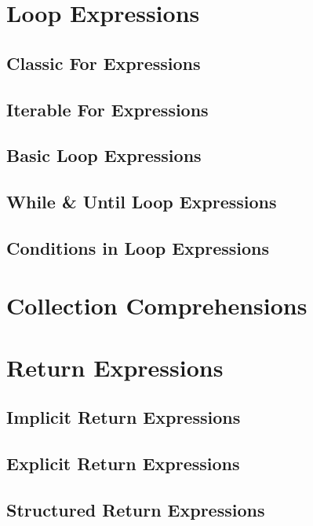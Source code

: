 \section{Loop Expressions}

\subsection{Classic For Expressions}

\subsection{Iterable For Expressions}

\subsection{Basic Loop Expressions}

\subsection{While \& Until Loop Expressions}

\subsection{Conditions in Loop Expressions}

\section{Collection Comprehensions}

\section{Return Expressions}

\subsection{Implicit Return Expressions}

\subsection{Explicit Return Expressions}

\subsection{Structured Return Expressions}

